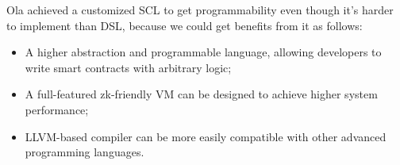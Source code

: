 Ola achieved a customized SCL to get programmability even though it's harder to implement than DSL, because we could get benefits from it as follows:
 \begin{itemize}
 \item A higher abstraction and programmable language, allowing developers to write smart contracts with arbitrary logic;
 \item A full-featured zk-friendly VM can be designed to achieve higher system performance;
 \item LLVM-based compiler can be more easily compatible with other advanced programming languages.
\end{itemize}
